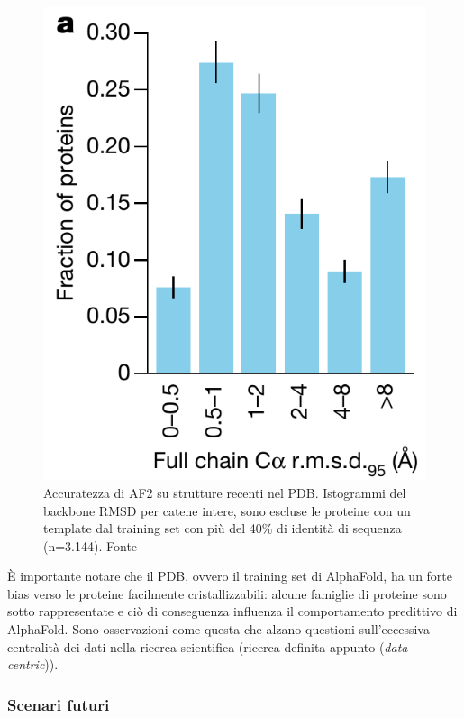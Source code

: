 \begin{figure}[!htb]
	\centering
	\includegraphics[scale=0.4]{images/af-basso.png}
	\caption{Accuratezza di AF2 su strutture recenti nel PDB. Istogrammi del backbone RMSD per catene intere, sono escluse le proteine con un template dal training set con più del 40\% di identità di sequenza (n=3.144). Fonte\cite{jumper2021highly}}
	\label{fig:af-basso}
\end{figure}

È importante notare che il PDB, ovvero il training set di AlphaFold, ha un forte bias verso le proteine facilmente cristallizzabili: alcune famiglie di proteine sono sotto rappresentate e ciò di conseguenza influenza il comportamento predittivo di AlphaFold. Sono osservazioni come questa che alzano questioni sull'eccessiva centralità dei dati nella ricerca scientifica (ricerca definita appunto (\textit{data-centric})).

\subsubsection{Scenari futuri}

